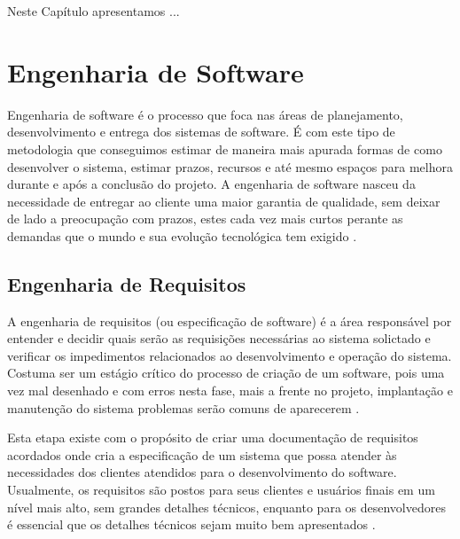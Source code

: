 \label{referencial}

Neste Capítulo apresentamos ...

\section{Engenharia de Software}
 Engenharia de software é o processo que foca nas áreas de planejamento, desenvolvimento e entrega dos sistemas de software. É com este tipo de metodologia que conseguimos estimar de maneira mais apurada formas de como desenvolver o sistema, estimar prazos, recursos e até mesmo espaços para melhora durante e após a conclusão do projeto. A engenharia de software nasceu da necessidade de entregar ao cliente uma maior garantia de qualidade, sem deixar de lado a preocupação com prazos, estes cada vez mais curtos perante as demandas que o mundo e sua evolução tecnológica tem exigido \cite{DBLP:books/lib/Sommerville07}. 

\subsection{Engenharia de Requisitos}
A engenharia de requisitos (ou especificação de software) é a área responsável por entender e decidir quais serão as requisições necessárias ao sistema solictado e verificar os impedimentos relacionados ao desenvolvimento e operação do sistema. Costuma ser um estágio crítico do processo de criação de um software, pois uma vez mal desenhado e com erros nesta fase, mais a frente no projeto, implantação e manutenção do sistema problemas serão comuns de aparecerem \cite{Sommerville07}.

Esta etapa existe com o propósito de criar uma documentação de requisitos acordados onde cria a especificação de um sistema que possa atender às necessidades dos clientes atendidos para o desenvolvimento do software. Usualmente, os requisitos são postos para seus clientes e usuários finais em um nível mais alto, sem grandes detalhes técnicos, enquanto para os desenvolvedores é essencial que os detalhes técnicos sejam muito bem apresentados \cite{Sommerville07}.

